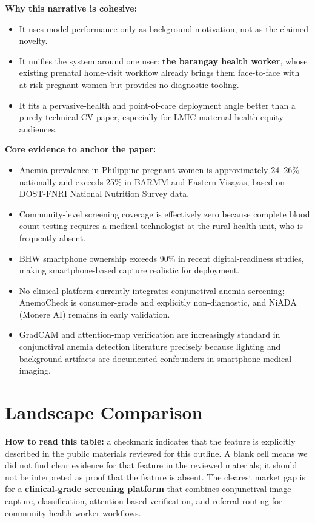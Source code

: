 \documentclass[11pt]{article}
\begin{document}
    \textbf{Why this narrative is cohesive:}
    \begin{itemize}[leftmargin=1.5em]
        \item It uses model performance only as background motivation, not as the claimed novelty.
        \item It unifies the system around one user: \textbf{the barangay health worker}, whose existing prenatal home-visit workflow already brings them face-to-face with at-risk pregnant women but provides no diagnostic tooling.
        \item It fits a pervasive-health and point-of-care deployment angle better than a purely technical CV paper, especially for LMIC maternal health equity audiences.
    \end{itemize}

    \textbf{Core evidence to anchor the paper:}
    \begin{itemize}[leftmargin=1.5em]
        \item Anemia prevalence in Philippine pregnant women is approximately 24--26\% nationally and exceeds 25\% in BARMM and Eastern Visayas, based on DOST-FNRI National Nutrition Survey data.
        \item Community-level screening coverage is effectively zero because complete blood count testing requires a medical technologist at the rural health unit, who is frequently absent.
        \item BHW smartphone ownership exceeds 90\% in recent digital-readiness studies, making smartphone-based capture realistic for deployment.
        \item No clinical platform currently integrates conjunctival anemia screening; AnemoCheck is consumer-grade and explicitly non-diagnostic, and NiADA (Monere AI) remains in early validation.
        \item GradCAM and attention-map verification are increasingly standard in conjunctival anemia detection literature precisely because lighting and background artifacts are documented confounders in smartphone medical imaging.
    \end{itemize}

    \section{Landscape Comparison}

    \textbf{How to read this table:} a checkmark indicates that the feature is explicitly described in the public materials reviewed for this outline. A blank cell means we did not find clear evidence for that feature in the reviewed materials; it should not be interpreted as proof that the feature is absent. The clearest market gap is for a \textbf{clinical-grade screening platform} that combines conjunctival image capture, classification, attention-based verification, and referral routing for community health worker workflows.
\end{document}
